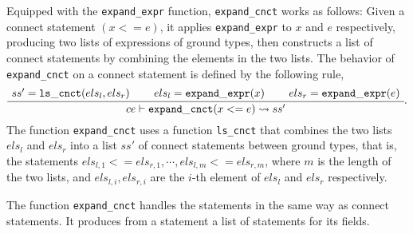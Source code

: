 Equipped with the {\tt expand\_expr} function, {\tt expand\_cnct} works as follows: Given a connect statement $(x <= e)$, it applies {\tt expand\_expr} to $x$ and $e$ respectively, producing two lists of expressions of ground types, then constructs a list of connect statements by combining the elements in the two lists. The behavior of {\tt expand\_cnct} on a connect statement is defined by the following rule, 
  \begin{gather}
  \label{expand-cnct}
    \inferiii[]
    {\seqq{ce\vdash{\tt expand\_cnct} (x <= e) \rightsquigarrow ss'}}
    {\seqq{ ss' = {\tt ls\_cnct}(els_l, els_r)}}
    {\seqq{els_l = {\tt expand\_expr}(x)}} 
    {\seqq{els_r = {\tt expand\_expr}(e)}}.
    \end{gather}
The function {\tt expand\_cnct} uses a function {\tt ls\_cnct} that combines the two lists $els_l$ and $els_r$ into a list $ss'$ of connect statements between ground types, that is, the statements $els_{l, 1} <= els_{r, 1}, \cdots, els_{l, m} <= els_{r, m}$, where $m$ is the length of the two lists, and $els_{l, i}, els_{r, i}$ are the $i$-th element of $els_l$ and $els_r$ respectively.

The function {\tt expand\_cnct} handles the  statements in the same way as connect statements. It produces from a  statement
 a list of  statements for its fields.
 
